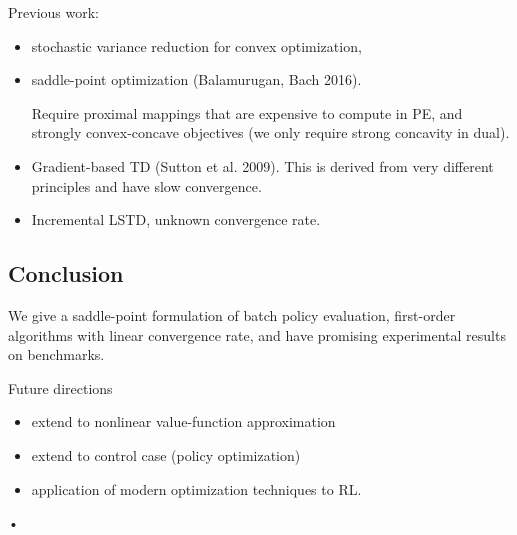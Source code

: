 Previous work:
\begin{itemize}
\item
 stochastic variance reduction for convex optimization, 
\item
saddle-point optimization (Balamurugan, Bach 2016).

Require proximal mappings that are expensive to compute in PE, and strongly convex-concave objectives (we only require strong concavity in dual).
\item
Gradient-based TD (Sutton et al. 2009). This is derived from very different principles and have slow convergence.
\item Incremental LSTD, unknown convergence rate.
\end{itemize}

\subsection{Conclusion}
We give a saddle-point formulation of batch policy evaluation, first-order algorithms with linear convergence rate, and have promising experimental results on benchmarks.

Future directions
\begin{itemize}
\item
extend to nonlinear value-function approximation
\item
extend to control case (policy optimization)
\item
application of modern optimization techniques to RL.
\end{itemize}•

